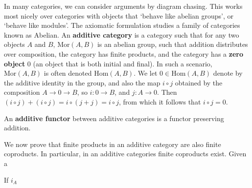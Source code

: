 In many categories, we can consider arguments by diagram chasing. This works most nicely over categories with objects that `behave like abelian groups', or `behave like modules'. The axiomatic formulation studies a family of categories known as Abelian. An {\bf additive category} is a category such that for any two objects $A$ and $B$, $\text{Mor}(A,B)$ is an abelian group, such that addition distributes over composition, the category has finite products, and the category has a {\bf zero object} $0$ (an object that is both initial and final). In such a scenario, $\text{Mor}(A,B)$ is often denoted $\text{Hom}(A,B)$. We let $0 \in \text{Hom}(A,B)$ denote by the additive identity in the group, and also the map $i \circ j$ obtained by the composition $A \to 0 \to B$, so $i: 0 \to B$, and $j: A \to 0$. Then $(i \circ j) + (i \circ j) = i \circ (j + j) = i \circ j$, from which it follows that $i \circ j = 0$.

An {\bf additive functor} between additive categories is a functor preserving addition.

We now prove that finite products in an additive category are also finite coproducts. In particular, in an additive categories finite coproducts exist. Given a 

\begin{lemma}
    If $i_A$
\end{lemma}

